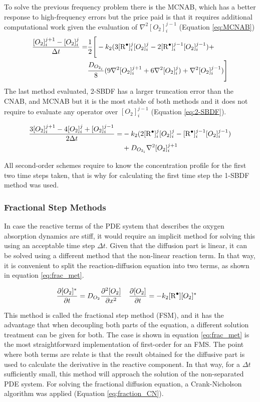 \documentclass[twoside,11pt]{report}
\newcounter{reaction}
\begin{document}
To solve the previous frequency problem there is the MCNAB, which has a better response to high-frequency errors but the price paid is that it requires additional computational work given the evaluation of $\nabla^2[O_2]_i^{j-1}$ \cite{ascher1995implicit} (Equation \ref{eq:MCNAB})
\begin{align}
  \frac{[O_2]^{j+1}_i-[O_2]^j_i}{\Delta t}=& \frac{1}{2}\Biggr[-k_2(3[\ce{R^.}]_i^{j}[O_2]_i^{j}-2[\ce{R^.}]_i^{j-1}[O_2]_i^{j-1})+\nonumber\\
  &\frac{D_{O_{2_i}}}{8}(9\nabla^2[O_2]_i^{j+1}+6\nabla^2[O_2]_i^{j})+\nabla^2[O_2]_i^{j-1})\Biggr]  
  \label{eq:MCNAB}
\end{align}
The last method evaluated, 2-SBDF has a larger truncation error than the CNAB, and MCNAB but it is the most stable of both methods and it does not require to evaluate any operator over $[O_2]_i^{j-1}$ (Equation \ref{eq:2-SBDF}).

\begin{align}
    \frac{3[O_2]^{j+1}_i-4[O_2]^j_i+[O_2]^{j-1}_i}{2\Delta t}=&-k_2(2[\ce{R^.}]_i^{j}[O_2]_i^{j}-[\ce{R^.}]_i^{j-1}[O_2]_i^{j-1})\nonumber\\
    &+D_{O_{2_i}}\nabla^2[O_2]_i^{j+1} 
    \label{eq:2-SBDF}
\end{align}

All second-order schemes require to know the concentration profile for the first two time steps taken, that is why for calculating the first time step the 1-SBDF method was used. 

\subsubsection{Fractional Step Methods}
In case the reactive terms of the PDE system that describes the oxygen absorption dynamics are stiff, it would require an implicit method for solving this using an acceptable time step $\Delta t$. Given that the diffusion part is linear, it can be solved using a different method that the non-linear reaction term. In that way, it is convenient to split the reaction-diffusion equation into two terms, as shown in equation \ref{eq:frac_met}.

\begin{align}
        \frac{\partial [O_2]^*}{\partial t}&=D_{O_2}\frac{\partial^2[O_2]}{\partial x^2}&
        \frac{\partial [O_2]}{\partial t} &=-k_2[\ce{R^.}][O_2]^*
    \label{eq:frac_met}
\end{align}

This method is called the fractional step method (FSM), and it has the advantage that when decoupling both parts of the equation, a different solution treatment can be given for both. The case is shown in equation  \ref{eq:frac_met} is the most straightforward implementation of first-order for an FMS. The point where both terms are relate is that the result obtained for the diffusive part is used to calculate the derivative in the reactive component. In that way, for a $\Delta t$ sufficiently small, this method will approach the solution of the non-separated PDE system. For solving the fractional diffusion equation, a Crank-Nicholson algorithm was applied (Equation \ref{eq:fraction_CN}).
\end{document}
